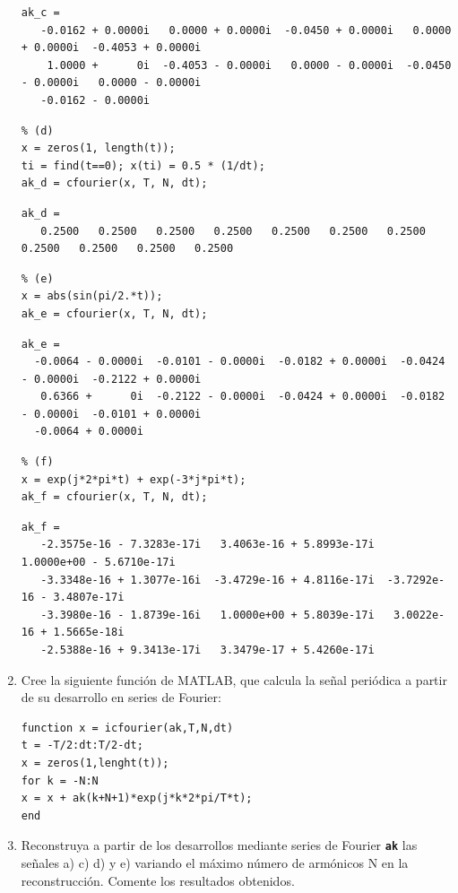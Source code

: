 \documentclass{article}
\newcommand{\code}[1]{\texttt{\textbf{#1}}}
\begin{document}
\begin{enumerate}[leftmargin=*]
\begin{verbatim}
ak_c =
   -0.0162 + 0.0000i   0.0000 + 0.0000i  -0.0450 + 0.0000i   0.0000 + 0.0000i  -0.4053 + 0.0000i
    1.0000 +      0i  -0.4053 - 0.0000i   0.0000 - 0.0000i  -0.0450 - 0.0000i   0.0000 - 0.0000i  
   -0.0162 - 0.0000i
\end{verbatim}

\begin{lstlisting}
% (d)
x = zeros(1, length(t));
ti = find(t==0); x(ti) = 0.5 * (1/dt);
ak_d = cfourier(x, T, N, dt);
\end{lstlisting}

\begin{verbatim}
ak_d =
   0.2500   0.2500   0.2500   0.2500   0.2500   0.2500   0.2500   0.2500   0.2500   0.2500   0.2500
\end{verbatim}

\begin{lstlisting}
% (e)
x = abs(sin(pi/2.*t));
ak_e = cfourier(x, T, N, dt);
\end{lstlisting}

\begin{verbatim}
ak_e =
  -0.0064 - 0.0000i  -0.0101 - 0.0000i  -0.0182 + 0.0000i  -0.0424 - 0.0000i  -0.2122 + 0.0000i   
   0.6366 +      0i  -0.2122 - 0.0000i  -0.0424 + 0.0000i  -0.0182 - 0.0000i  -0.0101 + 0.0000i  
  -0.0064 + 0.0000i
\end{verbatim}

\begin{lstlisting}
% (f)
x = exp(j*2*pi*t) + exp(-3*j*pi*t);
ak_f = cfourier(x, T, N, dt);
\end{lstlisting}

\begin{verbatim}
ak_f =
   -2.3575e-16 - 7.3283e-17i   3.4063e-16 + 5.8993e-17i   1.0000e+00 - 5.6710e-17i  
   -3.3348e-16 + 1.3077e-16i  -3.4729e-16 + 4.8116e-17i  -3.7292e-16 - 3.4807e-17i  
   -3.3980e-16 - 1.8739e-16i   1.0000e+00 + 5.8039e-17i   3.0022e-16 + 1.5665e-18i  
   -2.5388e-16 + 9.3413e-17i   3.3479e-17 + 5.4260e-17i
\end{verbatim}

\item Cree la siguiente función de MATLAB, que calcula la señal periódica a partir de su desarrollo en series de Fourier:

\begin{lstlisting}
function x = icfourier(ak,T,N,dt)
t = -T/2:dt:T/2-dt;
x = zeros(1,lenght(t));
for k = -N:N
x = x + ak(k+N+1)*exp(j*k*2*pi/T*t);
end
\end{lstlisting}
\item Reconstruya a partir de los desarrollos mediante series de Fourier \code{ak} las señales a) c) d) y e) variando el máximo número de armónicos N en la reconstrucción. Comente los resultados obtenidos.


\end{enumerate}
\end{document}

